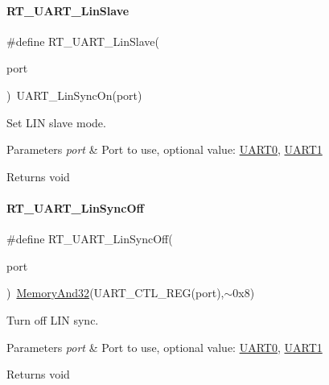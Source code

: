 \paragraph{\texorpdfstring{R\+T\+\_\+\+U\+A\+R\+T\+\_\+\+Lin\+Slave}{RT\_UART\_LinSlave}}
{\footnotesize\ttfamily \#define R\+T\+\_\+\+U\+A\+R\+T\+\_\+\+Lin\+Slave(\begin{DoxyParamCaption}\item[{}]{port }\end{DoxyParamCaption})~U\+A\+R\+T\+\_\+\+Lin\+Sync\+On(port)}



Set L\+IN slave mode. 


\begin{DoxyParams}{Parameters}
{\em port} & Port to use, optional value\+: \mbox{\hyperlink{a00056_a0508661f121639ffdee7de2353a0def2}{U\+A\+R\+T0}}, \mbox{\hyperlink{a00056_a8d69bf04d07af4fbbab5a8bd291f65ff}{U\+A\+R\+T1}} \\
\hline
\end{DoxyParams}
\begin{DoxyReturn}{Returns}
void 
\end{DoxyReturn}
\mbox{\label{a00056_aea01869278bc3c4e332af854c4e660be}} 
\paragraph{\texorpdfstring{R\+T\+\_\+\+U\+A\+R\+T\+\_\+\+Lin\+Sync\+Off}{RT\_UART\_LinSyncOff}}
{\footnotesize\ttfamily \#define R\+T\+\_\+\+U\+A\+R\+T\+\_\+\+Lin\+Sync\+Off(\begin{DoxyParamCaption}\item[{}]{port }\end{DoxyParamCaption})~\mbox{\hyperlink{a00020_ad87cedffcaadc51db22594fce55173d4}{Memory\+And32}}(U\+A\+R\+T\+\_\+\+C\+T\+L\+\_\+\+R\+EG(port),$\sim$0x8)}



Turn off L\+IN sync. 


\begin{DoxyParams}{Parameters}
{\em port} & Port to use, optional value\+: \mbox{\hyperlink{a00056_a0508661f121639ffdee7de2353a0def2}{U\+A\+R\+T0}}, \mbox{\hyperlink{a00056_a8d69bf04d07af4fbbab5a8bd291f65ff}{U\+A\+R\+T1}} \\
\hline
\end{DoxyParams}
\begin{DoxyReturn}{Returns}
void 
\end{DoxyReturn}
\mbox{\label{a00056_a49f9d43f5fd87ceed952123010e015fa}} 

